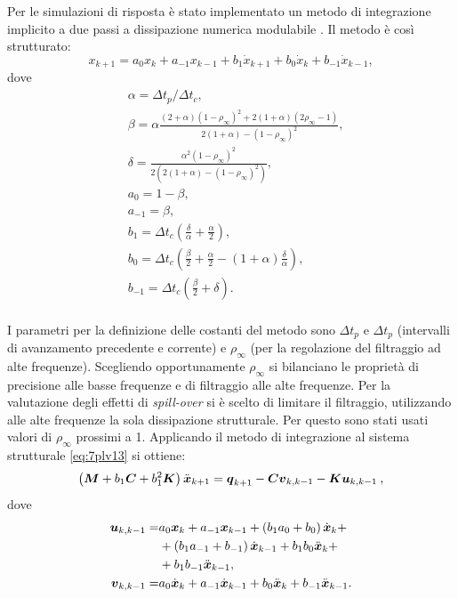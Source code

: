 Per le simulazioni di risposta è stato implementato un metodo di integrazione implicito a due passi a dissipazione numerica modulabile \citep{masarati_efficient_2014}. Il metodo è così strutturato:
\begin{equation}
\label{eq:7metodo1}
x_{k+1} = a_0x_k+a_{-1}x_{k-1}+b_1\dot{x}_{k+1}+b_0\dot{x}_k+b_{-1}\dot{x}_{k-1},
\end{equation}
dove
\begin{align}
\label{eq:7metodo2.0}
&\alpha = \Delta t_p /\Delta t_c,\\
\label{eq:7metodo2.1}
&\beta = \alpha\frac{(2+\alpha)(1-\rho_\infty)^2+2(1+\alpha)(2\rho_\infty-1)}{2(1+\alpha)-(1-\rho_\infty)^2},\\
\label{eq:7metodo2.2}
&\delta = \frac{\alpha^2(1-\rho_\infty)^2}{2(2(1+\alpha)-(1-\rho_\infty)^2)},\\
\label{eq:7metodo2.3}
&a_0 = 1-\beta,\\
\label{eq:7metodo2.4}
&a_{-1} = \beta,\\
\label{eq:7metodo2.5}
&b_1 = \Delta t_c \left(\frac{\delta}{\alpha}+\frac{\alpha}{2}\right),\\
\label{eq:7metodo2.6}
&b_0 = \Delta t_c\left(\frac{\beta}{2}+\frac{\alpha}{2} -(1+\alpha)\frac{\delta}{\alpha}\right),\\
\label{eq:7metodo2.7}
&b_{-1} = \Delta t_c \left(\frac{\beta}{2}+\delta\right).\\
\end{align}

I parametri per la definizione delle costanti del metodo sono $\Delta t_p$ e $\Delta t_p$ (intervalli di avanzamento precedente e corrente) e $\rho_\infty$ (per la regolazione del filtraggio ad alte frequenze). Scegliendo opportunamente $\rho_\infty$ si bilanciano le proprietà di precisione alle basse frequenze e di filtraggio alle alte frequenze. Per la valutazione degli effetti di \textit{spill-over} si è scelto di limitare il filtraggio, utilizzando alle alte frequenze la sola dissipazione strutturale. Per questo sono stati usati valori di $\rho_\infty$ prossimi a 1. Applicando il metodo di integrazione al sistema strutturale \eqref{eq:7plv13} si ottiene:
\begin{equation}
\label{eq:7metodo3}
\left(\boldsymbol{M}+b_1\boldsymbol{C}+b_1^2\boldsymbol{K}\right)\ddot{\boldsymbol{x}}_{k+1} = \boldsymbol{q}_{k+1}-\boldsymbol{C}\boldsymbol{v}_{k,k-1}-\boldsymbol{K}\boldsymbol{u}_{k,k-1}\:,
\end{equation}
dove
\begin{align}
\label{eq:7metodo4.0}
\boldsymbol{u}_{k,k-1} =& a_0\boldsymbol{x}_k+a_{-1}\boldsymbol{x}_{k-1}+\left(b_1a_0+b_0\right)\dot{\boldsymbol{x}}_k+\nonumber\\
&+\left(b_1a_{-1}+b_{-1}\right)\dot{\boldsymbol{x}}_{k-1}+ b_1b_0\ddot{\boldsymbol{x}}_k+\nonumber\\
&+b_1b_{-1}\ddot{\boldsymbol{x}}_{k-1},\\
\label{eq:7metodo4.1}
\boldsymbol{v}_{k,k-1} =& a_0\dot{\boldsymbol{x}}_k+a_{-1}\dot{\boldsymbol{x}}_{k-1}+ b_0\ddot{\boldsymbol{x}}_k+b_{-1}\ddot{\boldsymbol{x}}_{k-1}.
\end{align}

